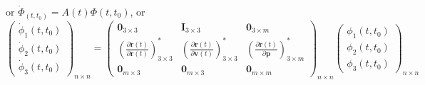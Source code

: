 or $\dot{\Phi}_(t,t_0) = A(t) \Phi (t,t_0)$, or
\begin{equation}
  \begin{pmatrix}
     \dot{\phi} _1 (t,t_0) \\ \dot{\phi} _2 (t,t_0) \\ \dot{\phi} _3 (t,t_0) \end{pmatrix}_{n \times n}
  = \begin{pmatrix}
      \bm{0}_{3 \times 3} & \bm{I}_{3 \times 3} & \bm{0}_{3 \times m} \\
      \left(\frac{\partial \ddot{\bm{r}}(t)}{\partial \bm{r}(t)}\right)^{*}_{3 \times 3} & 
      \left(\frac{\partial \ddot{\bm{r}}(t)}{\partial \bm{v}(t)}\right)^{*}_{3 \times 3} &
      \left(\frac{\partial \ddot{\bm{r}}(t)}{\partial \bm{p}}   \right)^{*}_{3 \times m} \\
      \bm{0}_{m \times 3} & \bm{0}_{m \times 3} & \bm{0}_{m \times m}
    \end{pmatrix}_{n \times n}
    \begin{pmatrix}
      \phi _1 (t,t_0) \\
      \phi _2 (t,t_0) \\
      \phi _3 (t,t_0)
    \end{pmatrix}_{n \times n}
\end{equation}

